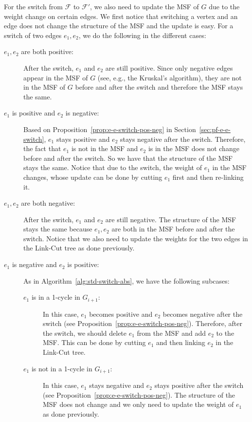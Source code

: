 \documentclass[letterpaper,11pt]{article}
\theoremstyle{mythmstyle}
\theoremstyle{mydefstyle}
\theoremstyle{plain}
\theoremstyle{definition}
\newcommand{\<}[1]{\langle #1\rangle}
\newcommand{\Fcal}{\mathcal{F}}
\theoremstyle{definition}
\begin{document}
For the switch from $\Fcal$ to $\Fcal'$,
we also need to update the MSF of $G$
due to the weight change on certain edges.
We first notice that switching a vertex and an edge
does not change the structure of the MSF
and the update is easy.
For a switch of two edges $e_1,e_2$, we do the following 
in the different cases:
\begin{description}
  \item[$e_1,e_2$ are both positive:]
  After the switch, $e_1$ and $e_2$ are still positive.
  Since only negative edges appear in the MSF of $G$ (see, e.g., the Kruskal's algorithm), 
  they are not in the MSF of $G$ 
  before and after the switch
  and therefore
  the MSF stays the same.
  \item[$e_1$ is positive and $e_2$ is negative:]
  Based on Proposition~\ref{prop:e-e-switch-pos-neg}
  in  Section~\ref{sec:pf-e-e-switch}, 
  $e_1$ stays positive and $e_2$ stays negative after the switch.
  Therefore, the fact that
  $e_1$ is not in the MSF and $e_2$ is in the MSF
  does not change before and after the switch.
  So we have that the structure of the MSF stays the same.
  Notice that due to the switch, the weight of $e_1$ in the MSF 
  changes, whose update can be done by
  cutting $e_1$ first and then re-linking it.
  \item[$e_1,e_2$ are both negative:]
  After the switch, $e_1$ and $e_2$ are still negative.
  The structure of the MSF stays the same because 
   $e_1,e_2$ are both in the MSF before and after the switch.
   Notice that we also need to update the weights for the two edges
in the Link-Cut tree as done previously.
  \item[$e_1$ is negative and $e_2$ is positive:]
  As in Algorithm~\ref{alg:std-switch-abs},
  we have the following subcases:
  \begin{description}
  \item[$e_1$ is in a 1-cycle in $G_{i+1}$:]
  In this case, $e_1$ becomes positive and $e_2$ becomes negative
  after the switch (see Proposition~\ref{prop:e-e-switch-pos-neg}).
  Therefore, after the switch, we should delete $e_1$
  from the MSF
  and add $e_2$ to the MSF.
  This can be done by cutting $e_1$ and then linking $e_2$ in the Link-Cut tree.
  \item[$e_1$ is not in a 1-cycle in $G_{i+1}$:]
  In this case, $e_1$ stays negative and $e_2$ stays positive
  after the switch (see Proposition~\ref{prop:e-e-switch-pos-neg}).
  The structure of the MSF does not change and we only 
  need to update the weight of $e_1$ as done previously.
  \end{description}
  

  
\end{description}
\end{document}
